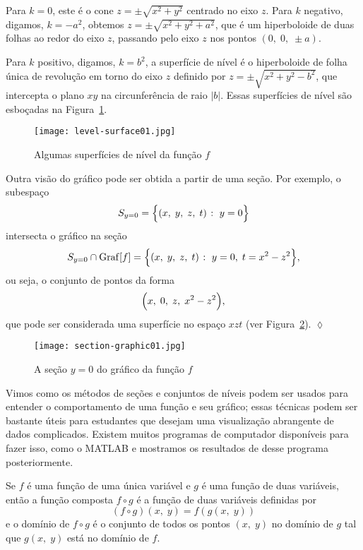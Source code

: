 Para \(k=0\), este é o cone \(z =\pm \sqrt{x^2+y^2}\) centrado no eixo \(z\). Para \(k\) negativo, digamos, \(k =-a^2\), obtemos \(z =\pm \sqrt{x^2+y^2+a^2}\), que é um hiperboloide de duas 
folhas ao redor do eixo \(z\), passando pelo eixo \(z\) nos pontos \((0,\; 0,\; \pm a)\). 

Para \(k\) positivo, digamos, \(k=b^2\), a superfície de nível é o hiperboloide de folha única de revolução em torno do
eixo \(z\) definido por \(z = \pm \sqrt{x^2+y^2-b^2}\), que intercepta o plano \(xy\) na circunferência de raio \(|b|\). Essas superfícies de nível são esboçadas na 
Figura~\ref{fig:2-1-13}.
%
\begin{figure}[H]
	\centering
	\texttt{[image: level-surface01.jpg]}
	\caption{Algumas superfícies de nível da função \(f\)}
	\label{fig:2-1-13}
\end{figure}
%

Outra visão do gráfico pode ser obtida a partir de uma seção. Por exemplo, o subespaço
\begin{equation*}
	S_{y=0} = \Bigl\{(x,\; y,\; z,\; t)\; \colon\; y = 0\Bigr\} 
\end{equation*}
intersecta  o gráfico na seção
\begin{equation*}
	S_{y=0} \cap \mathrm{Graf}[f] = \Bigl\{(x,\; y,\; z,\; t)\; \colon \;  y = 0,\;  t = x^2-z^2\Bigr\},
\end{equation*}
ou seja, o conjunto de pontos da forma 
\begin{equation*}
	\Bigl(x,\; 0,\; z,\; x^2-z^2\Bigr), 
\end{equation*}
que pode ser considerada uma superfície no espaço \(xzt\) (ver Figura~\ref{fig:2-1-14}). \hfill \(\lozenge\)
%
\begin{figure}[H]
	\centering
	\texttt{[image: section-graphic01.jpg]}
	\caption{A seção \(y=0\) do gráfico da função \(f\)}
	\label{fig:2-1-14}
\end{figure}
%

Vimos como os métodos de seções e conjuntos de níveis podem ser usados para entender o comportamento de uma função e seu gráfico; essas técnicas podem ser bastante úteis para estudantes que 
desejam uma visualização abrangente de dados complicados. Existem muitos programas de computador disponíveis para fazer isso, como o MATLAB e mostramos os resultados de desse programa 
posteriormente.


\begin{defi}\label{def:17-1-3}
	Se \(f\) é uma função de uma única variável e \(g\) é uma função de duas variáveis, então a função composta \(f\circ g\) é a função de duas variáveis 
	definidas por
	\begin{equation*}
		(f\circ g)(x,\; y)=f(g(x,\; y))
	\end{equation*}
	e o domínio de \(f\circ g\) é o conjunto de todos os pontos \((x,\; y)\) no domínio de \(g\) tal que \(g(x,\; y)\) está no domínio de \(f\).
\end{defi}

